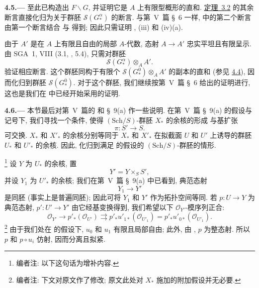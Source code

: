 
\medskip
{}\label{par:sga3-VIA-4.5}%
\noindent\textbf{4.5.---}
至此已构造出 \(F\backslash G\), 并证明它是 \(A\) 上有限型概形的直和.
\hyperref[thm:sga3-VIA-3.2]{定理~3.2} 的其余断言直接化归为关于群胚
\(\mathscr S(G^\alpha_*)\) 的断言.
与第~V~篇 \S~6 一样,  中的第二个断言
由第一个断言结合  与
 得到;
因此只需证明 , (iii) 和 (iv)(a).

由于 \(A'\) 是在 \(A\) 上有限且自由的局部 \(A\)-代数,
态射 \(A\to A'\) 忠实平坦且有限呈示.
由 SGA~1, VIII (3.1, , 5.4),
只需对群胚
\[
  \mathscr S(G^\alpha_*)\otimes_AA'.
\]
验证相应断言. 这个群胚同构于有限个 \(\mathscr S(G^0_*)\otimes_AA'\) 的副本的直和
(参见 \hyperref[par:sga3-VIA-4.4]{4.4}), 因而化归到群胚 \(\mathscr S(G^0_*)\).
对于这个群胚, 我们继续按第~V~篇 \S~6 给出的证明进行,
这也是我们在  中已经开始采用的证明.

\medskip
{}\label{par:sga3-VIA-4.6}%
\noindent\textbf{4.6.---}
本节最后对第~V~篇的
和 \S~9(a) 作一些说明.
在第~V~篇 \S~9(a) 的假设与记号下,
我们寻找一个条件, 使得 \((\mathrm{Sch}/S)\)-群胚 \(X_*\) 的余核的形成
与基扩张
\[
  \pi:S'\longrightarrow S.
\]
可交换. \(X_*\) 和 \(X'_*\) 的余核分别等同于
\(X_*\) 和 \(X'_*\) 在拟截面 \(U\) 和 \(U'\) 上诱导的群胚
\(U_*\) 和 \(U'_*\) 的余核.
因此, 化归到满足 的假设的
\((\mathrm{Sch}/S)\)-群胚的情形.

\footnote{\label{note:sga3-VIA-45}编者注: 以下这句话为增补内容.}%
设 \(Y\) 为 \(U_*\) 的余核, 置
\[
  Y'=Y\times_SS',
\]
并设 \(Y_1\) 为 \(U'_*\) 的余核;
我们在第~V~篇 \S~9(a) 中已看到, 典范态射
\[
  Y_1\longrightarrow Y'
\]
是同胚 (事实上是普遍同胚); 因此可将 \(Y_1\) 和 \(Y'\) 作为拓扑空间等同.
若 \(p:U\to Y\) 为典范态射,
\(p':U'\to Y'\) 由它经基变换得到,
我们希望以下 \(\mathcal O_{Y'}\)-模序列正合:
\[
  \tag{*}\label{eq:sga3-VIA-4.6-star}
  \mathcal O_{Y'}
    \longrightarrow p'_*(\mathcal O_{U'})
    \rightrightarrows
  p'_*u'_{1*}(\mathcal O_{U'_1})
    =
  p'_*u'_{0*}(\mathcal O_{U'_1}).
\]
\footnote{\label{note:sga3-VIA-46}编者注: 下文对原文作了修改;
原文此处对 \(X_*\) 施加的附加假设并无必要.}%
由于我们处在 的假设下,
\(u_0\) 和 \(u_1\) 有限且局部自由; 此外, 由
, \(p\) 为整态射.
所以 \(p\) 和 \(p\circ u_i\) 仿射, 因而分离且拟紧.

